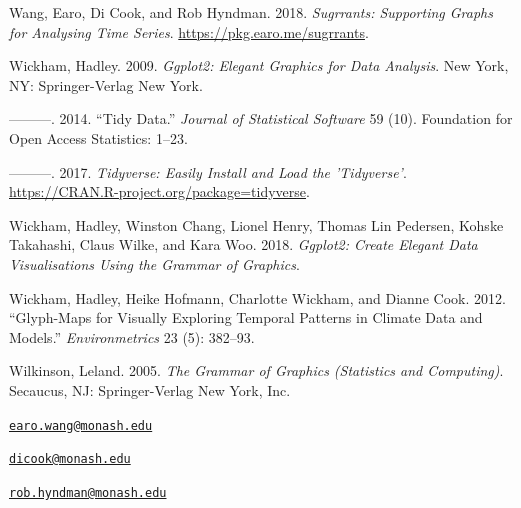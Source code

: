 \leavevmode\hypertarget{ref-R-sugrrants}{}%
Wang, Earo, Di Cook, and Rob Hyndman. 2018. \emph{Sugrrants: Supporting
Graphs for Analysing Time Series}. \url{https://pkg.earo.me/sugrrants}.

\leavevmode\hypertarget{ref-wickham2009ggplot2}{}%
Wickham, Hadley. 2009. \emph{Ggplot2: Elegant Graphics for Data
Analysis}. New York, NY: Springer-Verlag New York.

\leavevmode\hypertarget{ref-wickham2014tidy}{}%
---------. 2014. ``Tidy Data.'' \emph{Journal of Statistical Software}
59 (10). Foundation for Open Access Statistics: 1--23.

\leavevmode\hypertarget{ref-R-tidyverse}{}%
---------. 2017. \emph{Tidyverse: Easily Install and Load the
'Tidyverse'}. \url{https://CRAN.R-project.org/package=tidyverse}.

\leavevmode\hypertarget{ref-R-ggplot2}{}%
Wickham, Hadley, Winston Chang, Lionel Henry, Thomas Lin Pedersen,
Kohske Takahashi, Claus Wilke, and Kara Woo. 2018. \emph{Ggplot2: Create
Elegant Data Visualisations Using the Grammar of Graphics}.

\leavevmode\hypertarget{ref-Wickham2012glyph}{}%
Wickham, Hadley, Heike Hofmann, Charlotte Wickham, and Dianne Cook.
2012. ``Glyph-Maps for Visually Exploring Temporal Patterns in Climate
Data and Models.'' \emph{Environmetrics} 23 (5): 382--93.

\leavevmode\hypertarget{ref-wilkinson2006grammar}{}%
Wilkinson, Leland. 2005. \emph{The Grammar of Graphics (Statistics and
Computing)}. Secaucus, NJ: Springer-Verlag New York, Inc.



\address{%
Earo Wang\\
Monash University\\
Department of Econometrics and Business Statistics,\\ Monash University, VIC 3800\\ Australia\\
}
\href{mailto:earo.wang@monash.edu}{\nolinkurl{earo.wang@monash.edu}}

\address{%
Dianne Cook\\
Monash University\\
Department of Econometrics and Business Statistics,\\ Monash University, VIC 3800\\ Australia\\
}
\href{mailto:dicook@monash.edu}{\nolinkurl{dicook@monash.edu}}

\address{%
Rob J Hyndman\\
Monash University\\
Department of Econometrics and Business Statistics,\\ Monash University, VIC 3800\\ Australia\\
}
\href{mailto:rob.hyndman@monash.edu}{\nolinkurl{rob.hyndman@monash.edu}}

